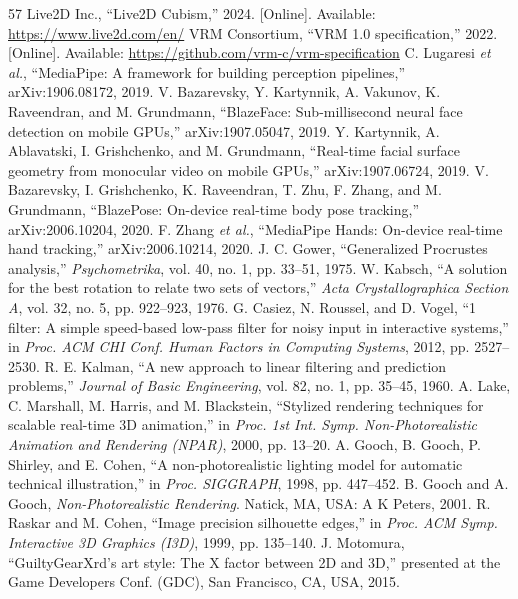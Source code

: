 \documentclass[conference]{IEEEtran}
\begin{document}
\begin{thebibliography}{57}
 Live2D Inc., ``Live2D Cubism,'' 2024. [Online]. Available: \url{https://www.live2d.com/en/}
 VRM Consortium, ``VRM 1.0 specification,'' 2022. [Online]. Available: \url{https://github.com/vrm-c/vrm-specification}
 C. Lugaresi \textit{et al.}, ``MediaPipe: A framework for building perception pipelines,'' arXiv:1906.08172, 2019.
 V. Bazarevsky, Y. Kartynnik, A. Vakunov, K. Raveendran, and M. Grundmann, ``BlazeFace: Sub-millisecond neural face detection on mobile GPUs,'' arXiv:1907.05047, 2019.
 Y. Kartynnik, A. Ablavatski, I. Grishchenko, and M. Grundmann, ``Real-time facial surface geometry from monocular video on mobile GPUs,'' arXiv:1907.06724, 2019.
 V. Bazarevsky, I. Grishchenko, K. Raveendran, T. Zhu, F. Zhang, and M. Grundmann, ``BlazePose: On-device real-time body pose tracking,'' arXiv:2006.10204, 2020.
 F. Zhang \textit{et al.}, ``MediaPipe Hands: On-device real-time hand tracking,'' arXiv:2006.10214, 2020.
 J. C. Gower, ``Generalized Procrustes analysis,'' \textit{Psychometrika}, vol. 40, no. 1, pp. 33--51, 1975.
 W. Kabsch, ``A solution for the best rotation to relate two sets of vectors,'' \textit{Acta Crystallographica Section A}, vol. 32, no. 5, pp. 922--923, 1976.
 G. Casiez, N. Roussel, and D. Vogel, ``1\texteuro{} filter: A simple speed-based low-pass filter for noisy input in interactive systems,'' in \textit{Proc. ACM CHI Conf. Human Factors in Computing Systems}, 2012, pp. 2527--2530.
 R. E. Kalman, ``A new approach to linear filtering and prediction problems,'' \textit{Journal of Basic Engineering}, vol. 82, no. 1, pp. 35--45, 1960.
 A. Lake, C. Marshall, M. Harris, and M. Blackstein, ``Stylized rendering techniques for scalable real-time 3D animation,'' in \textit{Proc. 1st Int. Symp. Non-Photorealistic Animation and Rendering (NPAR)}, 2000, pp. 13--20.
 A. Gooch, B. Gooch, P. Shirley, and E. Cohen, ``A non-photorealistic lighting model for automatic technical illustration,'' in \textit{Proc. SIGGRAPH}, 1998, pp. 447--452.
 B. Gooch and A. Gooch, \textit{Non-Photorealistic Rendering}. Natick, MA, USA: A K Peters, 2001.
 R. Raskar and M. Cohen, ``Image precision silhouette edges,'' in \textit{Proc. ACM Symp. Interactive 3D Graphics (I3D)}, 1999, pp. 135--140.
 J. Motomura, ``GuiltyGearXrd's art style: The X factor between 2D and 3D,'' presented at the Game Developers Conf. (GDC), San Francisco, CA, USA, 2015.

\end{thebibliography}
\end{document}
